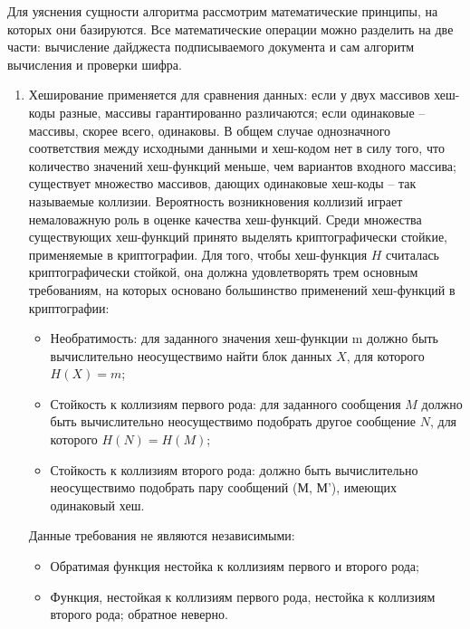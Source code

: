 Для уяснения сущности алгоритма рассмотрим математические принципы, на которых
они базируются. Все математические операции можно разделить на две части:
вычисление дайджеста подписываемого документа и сам алгоритм вычисления и
проверки шифра.
\begin{enumerate}
  \item Хеширование применяется для сравнения данных: если у двух массивов
  хеш-коды разные, массивы гарантированно различаются; если одинаковые --
  массивы, скорее всего, одинаковы. В общем случае однозначного соответствия
  между исходными данными и хеш-кодом нет в силу того, что количество значений
  хеш-функций меньше, чем вариантов входного массива; существует множество
  массивов, дающих одинаковые хеш-коды -- так называемые коллизии. Вероятность
  возникновения коллизий играет немаловажную роль в оценке качества хеш-функций.
Среди множества существующих хеш-функций принято выделять криптографически
стойкие, применяемые в криптографии. Для того, чтобы хеш-функция $H$ считалась
криптографически стойкой, она должна удовлетворять трем основным требованиям, на
которых основано большинство применений хеш-функций в криптографии:
	\begin{itemize}
	  \item Необратимость: для заданного значения хеш-функции m должно быть
	  вычислительно неосуществимо найти блок данных $X$, для которого $H(X) = m$;
	  \item Стойкость к коллизиям первого рода: для заданного сообщения $M$ должно
	  быть вычислительно неосуществимо подобрать другое сообщение $N$, для которого
	  $H(N) = H(M)$;
	  \item Стойкость к коллизиям второго рода: должно быть вычислительно
	  неосуществимо подобрать пару сообщений (М, М'), имеющих одинаковый хеш.
	\end{itemize}
	
Данные требования не являются независимыми:
  \begin{itemize}
    \item Обратимая функция нестойка к коллизиям первого и второго рода;
	\item Функция, нестойкая к коллизиям первого рода, нестойка к коллизиям второго
	рода; обратное неверно.
  \end{itemize}
	

\end{enumerate}
